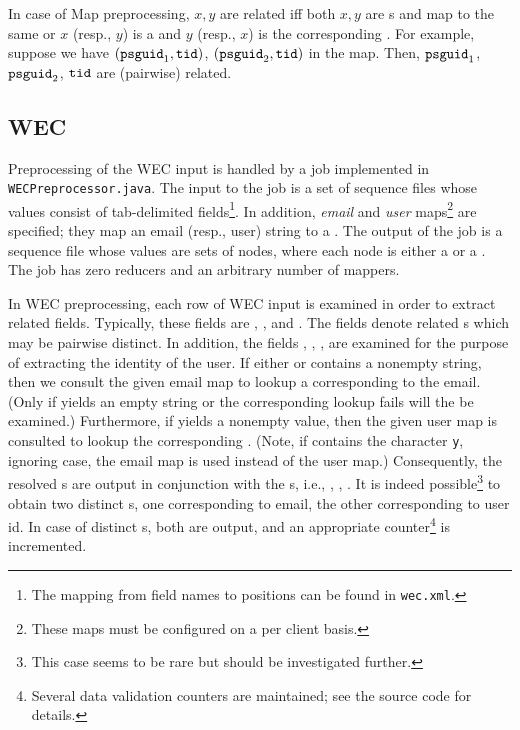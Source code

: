 \documentclass{article}[12pt]
\numberwithin{figure}{section}
\begin{document}
In case of Map preprocessing, $x, y$ are related iff both $x, y$ are {\PSGUID}s and map to the same {\TID} or
$x$ (resp., $y$) is a {\PSGUID} and $y$ (resp., $x$) is the corresponding {\TID}.
For example, suppose we have $(\texttt{psguid}_1, \texttt{tid})$, $(\texttt{psguid}_2, \texttt{tid})$ in the map.  Then, $\texttt{psguid}_1$, $\texttt{psguid}_2$, $\texttt{tid}$
are (pairwise) related.

\subsection{WEC}

Preprocessing of the WEC input is handled by a {\MAPREDUCE} job implemented in \texttt{WECPreprocessor.java}.
The input to the job is a set of sequence files whose values consist of tab-delimited fields\footnote{The mapping from
field names to positions can be found in \texttt{wec.xml}.}.
In addition, \emph{email} and \emph{user} maps\footnote{These maps must be configured on a per client basis.}
 are specified; they map an email (resp., user) string to a \TID.
The output of the job is a sequence file whose values are sets of nodes, where each node is either a {\GUID} or a {\TID}.
The job has zero reducers and an arbitrary number of mappers.

In WEC preprocessing, each row of WEC input is examined in order to extract related fields.  Typically, these fields
are {\PSRW, \PSRJ}, and {\PSGUID}.  The fields denote related {\GUID}s which may be pairwise distinct.
In addition, the fields {\EMAIL}, {\CONSUMERGUID}, {\CURRENTURL}, {\GUESTORDER} are examined for the purpose of extracting the identity
of the user.  If either {\EMAIL} or {\CURRENTURL} contains a nonempty string, then we consult the given email map to lookup
a {\TID} corresponding to the email.  (Only if {\EMAIL} yields an empty string or the corresponding lookup fails will
the {\CURRENTURL} be examined.)  Furthermore, if {\CONSUMERGUID} yields a nonempty value, then the given user map
is consulted to lookup the corresponding {\TID}.  (Note, if {\GUESTORDER} contains the character \texttt{y}, ignoring case, 
the email map is used instead of the user map.)
Consequently, the resolved {\TID}s are output in conjunction with the {\GUID}s, i.e., {\PSRW, \PSRJ, \PSGUID}.
It is indeed possible\footnote{This case seems to be rare but should be investigated further.}
to obtain two distinct {\TID}s, one corresponding to email, the other corresponding to user id.
In case of distinct {\TID}s, both are output, and an appropriate counter\footnote{Several data validation counters are
maintained; see the source code for details.} is incremented.
\end{document}
